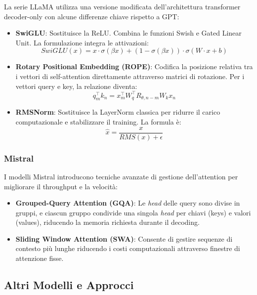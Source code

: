             La serie LLaMA utilizza una versione modificata dell'architettura transformer decoder-only con alcune differenze chiave rispetto a GPT:
            
            \begin{itemize}
                \item \textbf{SwiGLU}: Sostituisce la ReLU. Combina le funzioni Swish e Gated Linear Unit. La formulazione integra le attivazioni:
                $$SwiGLU(x) = x \cdot \sigma(\beta x) + (1 - \sigma(\beta x)) \cdot \sigma(W \cdot x + b)$$
                \item \textbf{Rotary Positional Embedding (ROPE)}: Codifica la posizione relativa tra i vettori di self-attention direttamente attraverso matrici di rotazione. Per i vettori query e key, la relazione diventa:
                $$q_m^\top k_n = x_m^\top W_q^\top R_{\theta,n-m} W_k x_n$$
                \item \textbf{RMSNorm}: Sostituisce la LayerNorm classica per ridurre il carico computazionale e stabilizzare il training. La formula è:
                $$\hat{x} = \frac{x}{RMS(x) + \epsilon}$$
            \end{itemize}

        \subsubsection{Mistral}

            I modelli Mistral introducono tecniche avanzate di gestione dell'attention per migliorare il throughput e la velocità:
            
            \begin{itemize}
                \item \textbf{Grouped-Query Attention (GQA)}: Le \textit{head} delle query sono divise in gruppi, e ciascun gruppo condivide una singola \textit{head} per chiavi (keys) e valori (values), riducendo la memoria richiesta durante il decoding.
                \item \textbf{Sliding Window Attention (SWA)}: Consente di gestire sequenze di contesto più lunghe riducendo i costi computazionali attraverso finestre di attenzione fisse.
            \end{itemize}

    \subsection{Altri Modelli e Approcci}

